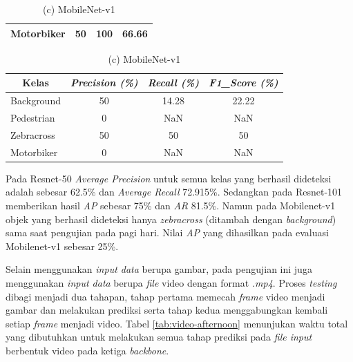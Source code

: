 \begin{table}[!h]
\begin{minipage}[b]{\textwidth}
\begin{tabular}{|l|c|c|c|}
			Motorbiker                           & 50                               & 100                           & 66.66                            \\ \hline
		\end{tabular}
	\end{minipage}
	\vfill
	\begin{minipage}[b]{\textwidth}
		\centering
		\caption*{(c) MobileNet-v1}
		\begin{tabular}{|l|c|c|c|}
			\hline
			\multicolumn{1}{|c|}{\textbf{Kelas}} & \textit{\textbf{Precision (\%)}} & \textit{\textbf{Recall (\%)}} & \textit{\textbf{F1\_Score (\%)}} \\ \hline
			Background                           & 50                               & 14.28                         & 22.22                            \\ \hline
			Pedestrian                           & 0                                & NaN                           & NaN                              \\ \hline
			Zebracross                           & 50                               & 50                            & 50                               \\ \hline
			Motorbiker                           & 0                                & NaN                           & NaN                              \\ \hline
		\end{tabular}
	\end{minipage}
	\label{tab:evaluate-afternoon}
\end{table}

Pada Resnet-50 \textit{Average Precision} untuk semua kelas yang berhasil dideteksi adalah sebesar 62.5\% dan \textit{Average Recall} 72.915\%. Sedangkan pada Resnet-101 memberikan hasil \textit{AP} sebesar 75\% dan \textit{AR} 81.5\%. Namun pada Mobilenet-v1 objek yang berhasil dideteksi hanya \textit{zebracross} (ditambah dengan \textit{background}) sama saat pengujian pada pagi hari. Nilai \textit{AP} yang dihasilkan pada evaluasi Mobilenet-v1 sebesar 25\%.

Selain menggunakan \textit{input data} berupa gambar, pada pengujian ini juga menggunakan \textit{input data} berupa \textit{file} video dengan format \textit{.mp4}. Proses \textit{testing} dibagi menjadi dua tahapan, tahap pertama memecah \textit{frame} video menjadi gambar dan melakukan prediksi serta tahap kedua menggabungkan kembali setiap \textit{frame} menjadi video. Tabel \ref{tab:video-afternoon} menunjukan waktu total yang dibutuhkan untuk melakukan semua tahap prediksi pada \textit{file input} berbentuk video pada ketiga \textit{backbone}.

